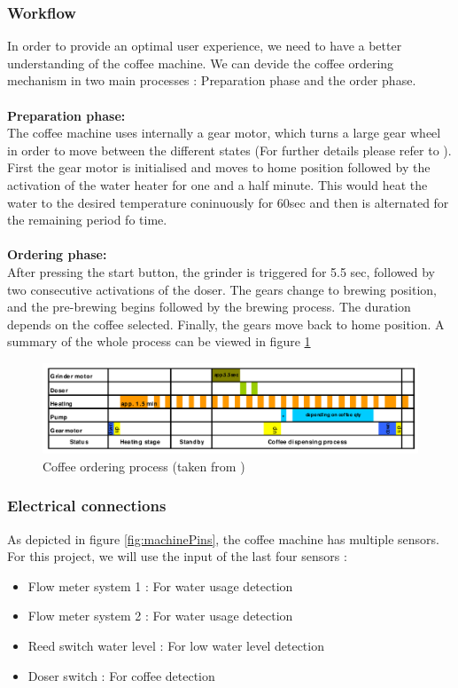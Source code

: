 \documentclass[12pt]{article}
\begin{document}
  \subsubsection{Workflow}
  In order to provide an optimal user experience, we need to have a better understanding of the coffee machine. 
  We can devide the coffee ordering mechanism in two main processes : Preparation phase and the order phase.\\~\\
  \textbf{Preparation phase:}\\
  
  The coffee machine uses internally a gear motor, which turns a large gear wheel in order to move between the different states (For further details please refer to \cite{Saeco}).
  First the gear motor is initialised and moves to home position followed by the activation of the water heater for one and a half minute. 
  This would heat the water to the desired temperature coninuously for 60sec and then is alternated for the remaining period fo time.\\~\\
  \textbf{Ordering phase:}\\
  
  After pressing the start button, the grinder is triggered for 5.5 sec, followed by two consecutive activations of the doser. 
  The gears change to brewing position, and the pre-brewing begins followed by the brewing process. The duration depends on the coffee selected. 
  Finally, the gears move back to home position. A summary of the whole process can be viewed in figure \ref{fig:timingCoffee}
  \begin{figure}[h]
   \centering
   \includegraphics[width=16cm]{./images/timing}
   \captionsetup{justification=centering}
   \caption{Coffee ordering process (taken from \cite{Saeco}) }
   \label{fig:timingCoffee}
  \end{figure}
  
  \subsubsection{Electrical connections}
  As depicted in figure \ref{fig:machinePins}, the coffee machine has multiple sensors. For this project, we will use the input of the last four sensors :
  \begin{itemize}
  \item Flow meter system 1 : For water usage detection
  \item Flow meter system 2 : For water usage detection
  \item Reed switch water level : For low water level detection
  \item Doser switch : For coffee detection
  \end{itemize}
  
\end{document}
